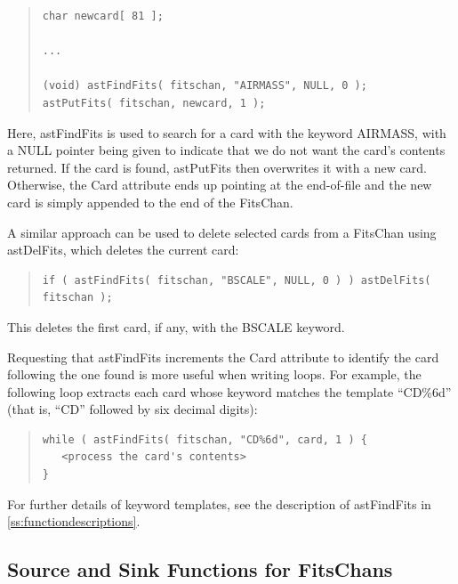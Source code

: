 \documentclass[twoside,11pt]{article}
\newcommand{\htmlref}[2]{#1}
\newcommand{\appref}[1]{Appendix~\ref{#1}}
\renewcommand{\appref}[1]{\ref{#1}}
\begin{document}
\begin{quote}
\small
\begin{verbatim}
char newcard[ 81 ];

...

(void) astFindFits( fitschan, "AIRMASS", NULL, 0 );
astPutFits( fitschan, newcard, 1 );
\end{verbatim}
\normalsize
\end{quote}

Here, astFindFits is used to search for a card with the keyword
AIRMASS, with a NULL pointer being given to indicate that we do not
want the card's contents returned. If the card is found, \htmlref{astPutFits}{astPutFits}
then overwrites it with a new card.  Otherwise, the Card attribute
ends up pointing at the end-of-file and the new card is simply
appended to the end of the FitsChan.

A similar approach can be used to delete selected cards from a
FitsChan using \htmlref{astDelFits}{astDelFits}, which deletes the current card:

\begin{quote}
\small
\begin{verbatim}
if ( astFindFits( fitschan, "BSCALE", NULL, 0 ) ) astDelFits( fitschan );
\end{verbatim}
\normalsize
\end{quote}

This deletes the first card, if any, with the BSCALE keyword.

Requesting that astFindFits increments the Card attribute to identify
the card following the one found is more useful when writing loops.
For example, the following loop extracts each card whose keyword
matches the template ``CD\%6d'' (that is, ``CD'' followed by six
decimal digits):

\begin{quote}
\small
\begin{verbatim}
while ( astFindFits( fitschan, "CD%6d", card, 1 ) {
   <process the card's contents>
}
\end{verbatim}
\normalsize
\end{quote}

For further details of keyword templates, see the description of
astFindFits in \appref{ss:functiondescriptions}.

\subsection{\label{ss:fitssourceandsink}Source and Sink Functions for FitsChans}
\end{document}
